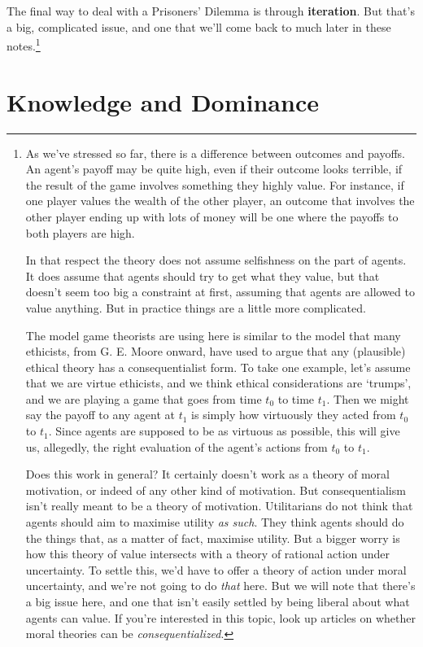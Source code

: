 The final way to deal with a Prisoners' Dilemma is through \textbf{iteration}. But that's a big, complicated issue, and one that we'll come back to much later in these notes.\footnote{As we've stressed so far, there is a difference between outcomes and payoffs. An agent's payoff may be quite high, even if their outcome looks terrible, if the result of the game involves something they highly value. For instance, if one player values the wealth of the other player, an outcome that involves the other player ending up with lots of money will be one where the payoffs to both players are high.

In that respect the theory does not assume selfishness on the part of agents. It does assume that agents should try to get what they value, but that doesn't seem too big a constraint at first, assuming that agents are allowed to value anything. But in practice things are a little more complicated.

The model game theorists are using here is similar to the model that many ethicists, from G. E. Moore onward, have used to argue that any (plausible) ethical theory has a consequentialist form. To take one example, let's assume that we are virtue ethicists, and we think ethical considerations are `trumps', and we are playing a game that goes from time $t_0$ to time $t_1$. Then we might say the payoff to any agent at $t_1$ is simply how virtuously they acted from $t_0$ to $t_1$. Since agents are supposed to be as virtuous as possible, this will give us, allegedly, the right evaluation of the agent's actions from $t_0$ to $t_1$.

Does this work in general? It certainly doesn't work as a theory of moral motivation, or indeed of any other kind of motivation. But consequentialism isn't really meant to be a theory of motivation. Utilitarians do not think that agents should aim to maximise utility \textit{as such}. They think agents should do the things that, as a matter of fact, maximise utility. But a bigger worry is how this theory of value intersects with a theory of rational action under uncertainty. To settle this, we'd have to offer a theory of action under moral uncertainty, and we're not going to do \textit{that} here. But we will note that there's a big issue here, and one that isn't easily settled by being liberal about what agents can value. If you're interested in this topic, look up articles on whether moral theories can be \textit{consequentialized}.}

\section{Knowledge and Dominance}

